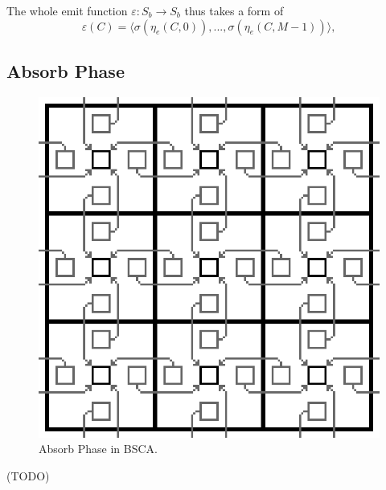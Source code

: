 \documentclass[a4paper,12pt,tikz,UTF8]{article}
\begin{document}
    The whole emit function $\varepsilon: S_b \to S_b$ thus takes a form of
    \begin{equation}
      \varepsilon(C) = \langle \sigma(\eta_e(C, 0)), ..., \sigma(\eta_e(C, M - 1)) \rangle,
    \end{equation}

  \subsection{Absorb Phase}
    \begin{figure}[H]
      \centering
      \includegraphics[scale=0.2]{bsca_absorb}
      \caption{Absorb Phase in BSCA.}
      \label{fig:emit-phase}
    \end{figure}

   (TODO)
\end{document}
